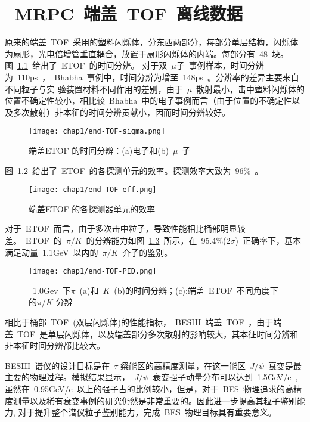 \chapter{~MRPC~端盖~TOF~离线数据}
原来的端盖~TOF~采用的塑料闪烁体，分东西两部分，每部分单层结构，闪烁体为扇形，光电倍增管垂直耦合，放置于扇形闪烁体的内端。每部分有~48~块。
图~\ref{fig:end-TOF-sigma}~给出了~ETOF~的时间分辨。
对于双~$\mu$子~事例样本，时间分辨为~110ps~，~Bhabha~事例中，时间分辨为增至~148ps~\cite{zhaoc:2011}。分辨率的差异主要来自不同粒子与实
验装置材料不同作用的差别，由于~$\mu$~散射最小，击中塑料闪烁体的位置不确定性较小，相比较~Bhabha~中的电子事例而言（由于位置的不确定性以及多次散射）非本征的时间分辨贡献小，因而时间分辨较好。
\begin{figure}[!h]
  \centering
  \texttt{[image: chap1/end-TOF-sigma.png]}
  \caption{端盖ETOF 的时间分辨：(a)电子和(b)~$\mu$~子}
  \label{fig:end-TOF-sigma}
\end{figure}
图~\ref{fig:end-TOF-eff}~给出了~ETOF~的各探测单元的效率。探测效率大致为~96$\%$~\cite{wangxz2016}。
\begin{figure}[!h]
  \centering
  \texttt{[image: chap1/end-TOF-eff.png]}
  \caption{端盖ETOF 的各探测器单元的效率}
  \label{fig:end-TOF-eff}
\end{figure}

对于~ETOF~而言，由于多次击中粒子，导致性能相比桶部明显较差。~ETOF~的~$\pi/K$~的分辨能力如图~\ref{fig:end-TOF-PID}~\cite{zhaoc:2011}所示，在~95.4$\%$(2$\sigma$)~正确率下，基本满足动量~1.1GeV~以内的~$\pi/K$~介子的鉴别。

\begin{figure}[!h]
  \centering
  \texttt{[image: chap1/end-TOF-PID.png]}
  \caption{~1.0Gev~下$\pi$~(a)和~$K$~(b)的时间分辨；(c):端盖~ETOF~不同角度下的$\pi/K$ 分辨}
  \label{fig:end-TOF-PID}
\end{figure}

相比于桶部~TOF~(双层闪烁体)的性能指标，~BESIII~端盖~TOF~，由于端盖~TOF~是单层闪烁体，以及端盖部分多次散射的影响较大，其本征时间分辨和非本征时间分辨都比较大。

BESIII~谱仪的设计目标是在~$\tau$-粲能区的高精度测量，在这一能区~$J/\psi$~衰变是最主要的物理过程。模拟结果显示，~$J/\psi$~衰变强子动量分布可以达到~1.5GeV/c~,虽然在~0.95GeV/c~以上的强子占的比例较小，但是，对于~BES~物理追求的高精度测量以及稀有衰变事例的研究仍然是非常重要的。因此进一步提高其粒子鉴别能力, 对于提升整个谱仪粒子鉴别能力，完成~BES~物理目标具有重要意义。

